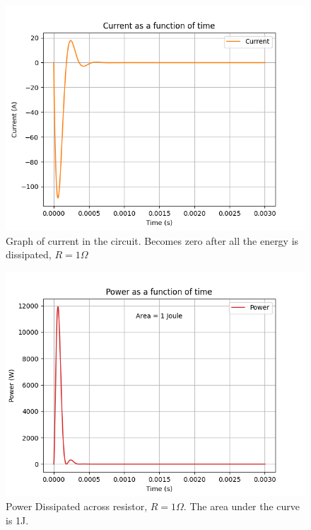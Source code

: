 \documentclass[journal,12pt,twocolumn]{IEEEtran}
\theoremstyle{remark}
\begin{document}
\begin{figure}[H]
    \includegraphics[width=1\columnwidth]{figs/Current_in_circuit_during_damping.png }
    \caption{Graph of current in the circuit. Becomes zero after all the energy is dissipated, $R=1\Omega$}
    \label{fig:current_in_damping}
\end{figure}

\begin{figure}[H]
    \includegraphics[width=1\columnwidth]{figs/Power_Dissipated_across_Resistor.png }
    \caption{Power Dissipated across resistor, $R=1\Omega$. The area under the curve is 1J.}
    \label{fig:power_in_damping}
\end{figure}
\end{document}
